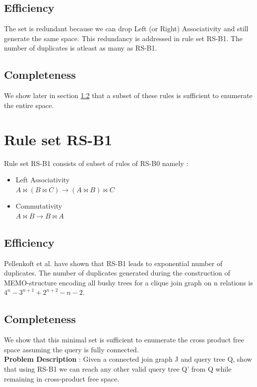 \subsection{Efficiency}
The set is redundant because we can drop Left (or Right) Associativity and still generate the same space. This redundancy is addressed in rule set RS-B1. The number of duplicates is atleast as many as RS-B1.

\subsection{Completeness}
We show later in section \ref{rsb1complete} that a subset of these rules is sufficient to enumerate the entire space. 

\section{Rule set RS-B1}
Rule set RS-B1 consists of subset of rules of RS-B0 namely :
\begin{itemize}
	\item Left Associativity \\ $A \bowtie (B \bowtie C) \rightarrow (A \bowtie B) \bowtie C$
	\item Commutativity \\ $A \bowtie B \rightarrow B \bowtie A$
\end{itemize}

\subsection{Efficiency}
Pellenkoft et al. \cite{pellenkoft1997complexity} have shown that RS-B1 leads to exponential number of duplicates. The number of duplicates generated during the construction of MEMO-structure encoding all bushy trees for a clique join graph on n relations is $4^{n}-3^{n+1}+2^{n+2}-n-2$.

\subsection{Completeness}
\label{rsb1complete}

We show that this minimal set is sufficient to enumerate the cross product free space assuming the query is fully connected. \\

\textbf{Problem Description} : Given a connected join graph J and query tree Q, show that using RS-B1 we can reach any other valid query tree Q' from Q while remaining in cross-product free space. \\

